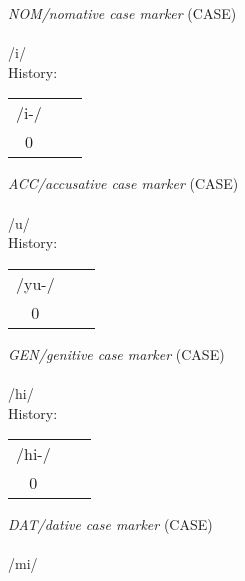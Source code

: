 \vspace{30pt}
 \textit{NOM/nomative case marker} (CASE)\\
\\
\noindent /{\textprimstress}i/\\


\noindent History:
\begin{tabular}{ccc}
/i-/\\
0\\
\end{tabular}

\vspace{20pt}\hline



\vspace{30pt}
 \textit{ACC/accusative case marker} (CASE)\\
\\
\noindent /{\textprimstress}u/\\


\noindent History:
\begin{tabular}{ccc}
/yu-/\\
0\\
\end{tabular}

\vspace{20pt}\hline



\vspace{30pt}
 \textit{GEN/genitive case marker} (CASE)\\
\\
\noindent /h{\textprimstress}i/\\


\noindent History:
\begin{tabular}{ccc}
/hi-/\\
0\\
\end{tabular}

\vspace{20pt}\hline



\vspace{30pt}
 \textit{DAT/dative case marker} (CASE)\\
\\
\noindent /m{\textprimstress}i/\\


